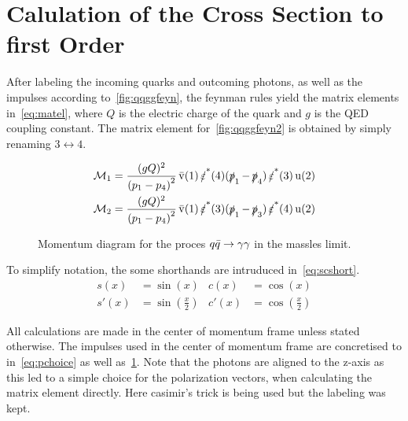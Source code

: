 \section{Calulation of the Cross Section to first Order}%
\label{sec:qqggcalc}

After labeling the incoming quarks and outcoming photons, as well as
the impulses according to~\ref{fig:qqggfeyn}, the feynman rules yield
the matrix elements in~\eqref{eq:matel}, where \(Q\) is the electric
charge of the quark and \(g\) is the QED coupling constant. The matrix
element for~\ref{fig:qqggfeyn2} is obtained by simply renaming
\(3\leftrightarrow 4\).

\begin{align}
  \label{eq:matel}
  \mathcal{M}_1 &= \frac{(gQ)^2}{\qty(p_1 - p_4)^2}\vsb(1)\pses(4)(\ps_1 -
                \ps_4)\pses(3)\us(2)\\
  \mathcal{M}_2 &= \frac{(gQ)^2}{\qty(p_1 - p_4)^2}\vsb(1)\pses(3)(\ps_1 - \ps_3)\pses(4)\us(2)
\end{align}

\begin{wrapfigure}{R}{0.4\textwidth}
\centering
{}
\caption{\label{fig:qqimpulses} Momentum diagram for the proces
  \(q\bar{q}\rightarrow\gamma\gamma\) in the massles limit.}
\end{wrapfigure}


To simplify notation, the some shorthands are intruduced
in~\eqref{eq:scshort}.
\begin{align}
  \label{eq:scshort}
  s(x) &= \sin(x) & c(x) &= \cos(x) \\ s'(x) &= \sin(\frac{x}{2}) & c'(x) &= \cos(\frac{x}{2})
\end{align}

All calculations are made in the center of momentum frame unless
stated otherwise.  The impulses used in the center of momentum frame
are concretised to in~\eqref{eq:pchoice} as well
as~\ref{fig:qqimpulses}.  Note that the photons are aligned to the
z-axis as this led to a simple choice for the polarization vectors,
when calculating the matrix element directly. Here casimir's trick is
being used but the labeling was kept.


